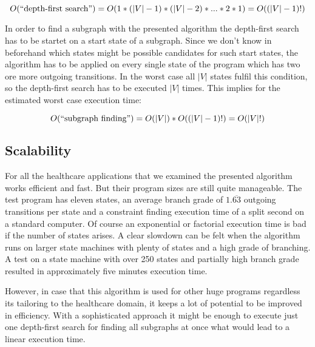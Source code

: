 \begin{equation}
O(\textnormal{``depth-first search''})=O(1*(|V|-1)*(|V|-2)*...*2*1)=O((|V|-1)!)
\end{equation}

In order to find a subgraph with the presented algorithm the depth-first search has to be startet on a start state of a subgraph. Since we don't know in beforehand which states might be possible candidates for such start states, the algorithm has to be applied on every single state of the program which has two ore more outgoing transitions. In the worst case all $|V|$ states fulfil this condition, so the depth-first search has to be executed $|V|$ times. This implies for the estimated worst case execution time:

\begin{equation}
O(\textnormal{``subgraph finding''})=O(|V|)*O((|V|-1)!)=O(|V|!)
\end{equation}



\subsection{Scalability}

For all the healthcare applications that we examined the presented algorithm works efficient and fast. But their program sizes are still quite manageable. The test program has eleven states, an average branch grade of $1.\overline{63}$ outgoing transitions per state and a constraint finding execution time of a split second on a standard computer.
Of course an exponential or factorial execution time is bad if the number of states arises. A clear slowdown can be felt when the algorithm runs on larger state machines with plenty of states and a high grade of branching. A test on a state machine with over 250 states and partially high branch grade resulted in approximately five minutes execution time.

However, in case that this algorithm is used for other huge programs regardless its tailoring to the healthcare domain, it keeps a lot of potential to be improved in efficiency. With a sophisticated approach it might be enough to execute just one depth-first search for finding all subgraphs at once what would lead to a linear execution time.




